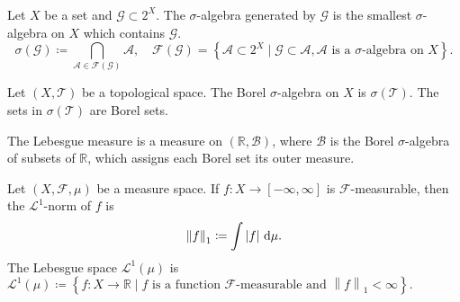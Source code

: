 \begin{frame}
	\frametitle{\secname}

	\begin{definition}
		Let $X$ be a set and $\mathcal{G}\subset 2^{X}$.
		The \alert{$\sigma$-algebra generated} by $\mathcal{G}$ is the
		smallest $\sigma$-algebra on $X$ which contains $\mathcal{G}$.
		\begin{equation*}
			\sigma\left(\mathcal{G}\right)\coloneqq
			\bigcap\limits_{
				\mathcal{A}\in\mathcal{F}\left(\mathcal{G}\right)
			}
			\mathcal{A},\quad
			\mathcal{F}\left(\mathcal{G}\right)=
			\left\{
			\mathcal{A}\subset 2^{X}\mid
			\mathcal{G}\subset\mathcal{A},
			\mathcal{A}\text{ is a $\sigma$-algebra on $X$}
			\right\}.
		\end{equation*}
	\end{definition}

	\begin{definition}
		Let $\left(X,\mathcal{T}\right)$ be a topological space.
		The \alert{Borel $\sigma$-algebra} on $X$ is
		$\sigma\left(\mathcal{T}\right)$.
		The sets in $\sigma\left(\mathcal{T}\right)$ are
		\alert{Borel sets}.
	\end{definition}

	\begin{definition}
		The \alert{Lebesgue measure} is a measure
		on $\left(\mathds{R},\mathcal{B}\right)$, where $\mathcal{B}$ is
		the Borel $\sigma$-algebra of subsets of $\mathds{R}$, which
		assigns each Borel set its outer measure.
	\end{definition}

	\begin{definition}
		Let $\left(X,\mathcal{F},\mu\right)$ be a measure space.
		If $f\colon X\to\left[-\infty,\infty\right]$ is
		$\mathcal{F}$-measurable, then the
		\alert{$\mathcal{L}^{1}$-norm} of $f$ is
		\begin{equation*}
			{\left\|f\right\|}_{1}\coloneqq
			\int\left|f\right|\dl\mu.
		\end{equation*}
		The \alert{Lebesgue space} $\mathcal{L}^{1}\left(\mu\right)$
		is
		\begin{math}
			\mathcal{L}^{1}\left(\mu\right)\coloneqq
			\left\{
			f\colon X\to\mathds{R}\mid
			f\text{ is a function $\mathcal{F}$-measurable and }
			\left\|f\right\|_{1}<\infty
			\right\}.
		\end{math}
	\end{definition}

\end{frame}

